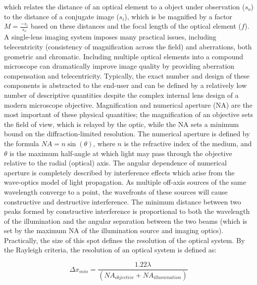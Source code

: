 \noindent which relates the distance of an optical element to a object under observation ($s_o$) to the distance of a conjugate image ($s_i$), which is be magnified by a factor $M = \frac{-s_i}{s_o}$ based on these distances and the focal length of the optical element ($f$). A single-lens imaging system imposes many practical issues, including telecentricity (consistency of magnification across the field) and aberrations, both geometric and chromatic. Including multiple optical elements into a compound microscope can dramatically improve image quality by providing aberration compensation and telecentricity. Typically, the exact number and design of these components is abstracted to the end-user and can be defined by a relatively low number of descriptive quantities despite the complex internal lens design of a modern microscope objective. Magnification and numerical aperture (NA) are the most important of these physical quantities; the magnification of an objective sets the field of view, which is relayed by the optic, while the NA sets a minimum bound on the diffraction-limited resolution. The numerical aperture is defined by the formula $NA=n\sin (\theta)$, where $n$ is the refractive index of the medium, and $\theta$ is the maximum half-angle at which light may pass through the objective relative to the radial (optical) axis. The angular dependence of numerical aperture is completely described by interference effects which arise from the wave-optics model of light propagation. As multiple off-axis sources of the same wavelength converge to a point, the wavefronts of these sources will cause constructive and destructive interference. The minimum distance between two peaks formed by constructive interference is proportional to both the wavelength of the illumination and the angular separation between the two beams (which is set by the maximum NA of the illumination source and imaging optics). Practically, the size of this spot defines the resolution of the optical system. By the Rayleigh criteria, the resolution of an optical system is defined as:

\begin{equation}\label{eq:intro:rayleigh}
\Delta x_{min}  = \frac{1.22 \lambda}{(NA_{objective} + NA_{illumination})}
\end{equation}

